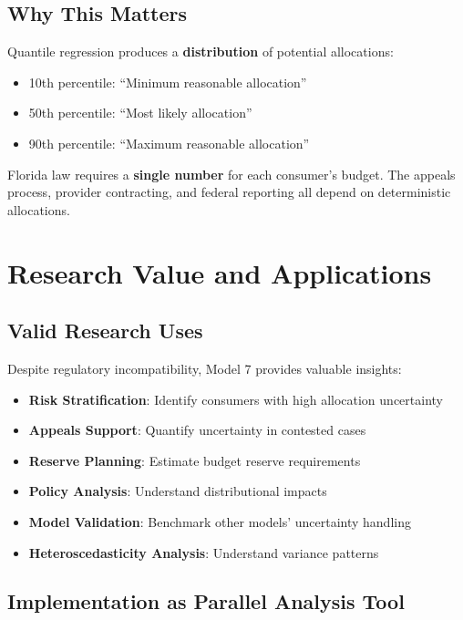 \subsection{Why This Matters}

Quantile regression produces a \textbf{distribution} of potential allocations:
\begin{itemize}
    \item 10th percentile: ``Minimum reasonable allocation''
    \item 50th percentile: ``Most likely allocation''
    \item 90th percentile: ``Maximum reasonable allocation''
\end{itemize}

Florida law requires a \textbf{single number} for each consumer's budget. The appeals process, provider contracting, and federal reporting all depend on deterministic allocations.

\section{Research Value and Applications}

\subsection{Valid Research Uses}

Despite regulatory incompatibility, Model 7 provides valuable insights:

\begin{itemize}
    \item \textbf{Risk Stratification}: Identify consumers with high allocation uncertainty
    \item \textbf{Appeals Support}: Quantify uncertainty in contested cases
    \item \textbf{Reserve Planning}: Estimate budget reserve requirements
    \item \textbf{Policy Analysis}: Understand distributional impacts
    \item \textbf{Model Validation}: Benchmark other models' uncertainty handling
    \item \textbf{Heteroscedasticity Analysis}: Understand variance patterns
\end{itemize}

\subsection{Implementation as Parallel Analysis Tool}

